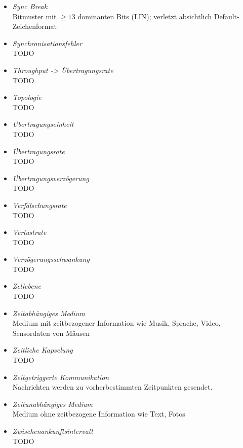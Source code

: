 \documentclass{article}
\begin{document}
\begin{itemize}
	\item \emph{Sync Break}\\
		Bitmuster mit $\geq 13$ dominanten Bits (LIN); verletzt absichtlich Default-Zeichenformat

	\item \emph{Synchronisationsfehler}\\
		TODO

	\item \emph{Throughput -> Übertragungsrate}\\
		TODO

	\item \emph{Topologie}\\
		TODO

	\item \emph{Übertragungseinheit}\\
		TODO

	\item \emph{Übertragungsrate}\\
		TODO

	\item \emph{Übertragungsverzögerung}\\
		TODO

	\item \emph{Verfälschungsrate}\\
		TODO

	\item \emph{Verlustrate}\\
		TODO

	\item \emph{Verzögerungsschwankung}\\
		TODO

	\item \emph{Zellebene}\\
		TODO

	\item \emph{Zeitabhängiges Medium}\\
		Medium mit zeitbezogener Information wie Musik, Sprache, Video, Sensordaten von Mäusen
	
	\item \emph{Zeitliche Kapselung}\\
		TODO

	\item \emph{Zeitgetriggerte Kommunikation}\\
		Nachrichten werden zu vorherbestimmten Zeitpunkten gesendet.

	\item \emph{Zeitunabhängiges Medium}\\
		Medium ohne zeitbezogene Information wie Text, Fotos

	\item \emph{Zwischenankunftsintervall}\\
		TODO
\end{itemize}
\end{document}

